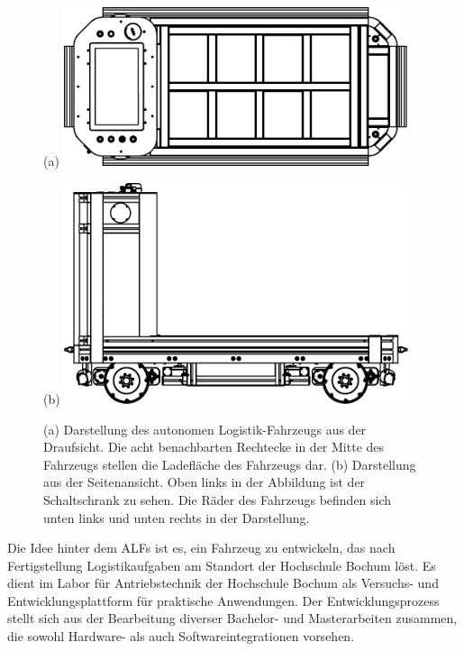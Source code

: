		\begin{figure}[H]
			\begin{minipage}[b]{0.49\textwidth}
				(a)
				\includegraphics[width=0.9\textwidth]{Bilder/oben.pdf}
			\end{minipage}
			\begin{minipage}[b]{0.49\textwidth}
				(b)
				\includegraphics[width=0.9\textwidth]{Bilder/seite.pdf}
			\end{minipage}
			\centering
			\caption{(a) Darstellung des autonomen Logistik-Fahrzeugs aus der Draufsicht. Die acht benachbarten Rechtecke in der Mitte des Fahrzeugs stellen die Ladefläche des Fahrzeugs dar. (b) Darstellung aus der Seitenansicht. Oben links in der Abbildung ist der Schaltschrank zu sehen. Die Räder des Fahrzeugs befinden sich unten links und unten rechts in der Darstellung.}
			\label{fig: Darstellung des ALFs}
		\end{figure}
		
		Die Idee hinter dem ALFs ist es, ein Fahrzeug zu entwickeln, das nach Fertigstellung Logistikaufgaben am Standort der Hochschule Bochum löst. Es dient im Labor für Antriebstechnik der Hochschule Bochum als Versuchs- und Entwicklungsplattform für praktische Anwendungen. Der Entwicklungsprozess stellt sich aus der Bearbeitung diverser Bachelor- und Masterarbeiten zusammen, die sowohl Hardware- als auch Softwareintegrationen vorsehen.\\
		
